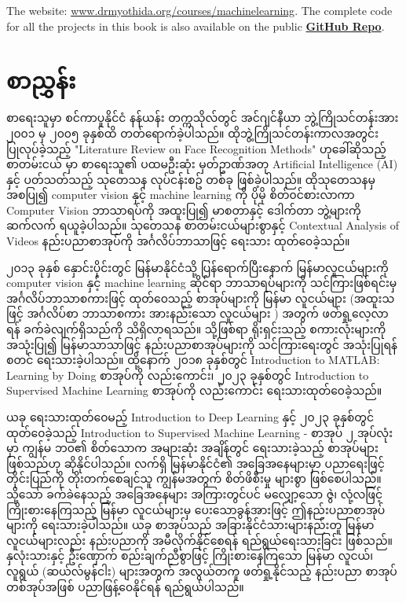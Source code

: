 The website: \href{www.drmyothida.org/courses}{www.drmyothida.org/courses/machinelearning}. The complete code for all the projects in this book is also available on the public \href{https://github.com/myothida/Intro-To-Supervised-Machine-Learning.git}{\textbf{GitHub Repo}}.

\chapter*{စာညွှန်း}

စာရေးသူမှာ စင်ကာပူနိုင်ငံ နန်ယန်း တက္ကသိုလ်တွင် အင်ဂျင်နီယာ ဘွဲ့ကြိုသင်တန်းအား ၂၀၀၁ မှ ၂၀၀၅ ခုနှစ်ထိ တတ်ရောက်ခဲ့ပါသည်။ ထိုဘွဲ့ကြိုသင်တန်းကာလအတွင်း ပြုလုပ်ခဲ့သည့် "Literature Review on Face Recognition Methods" ဟုခေါ်ဆိုသည့် စာတမ်းငယ် မှာ စာရေးသူ၏ ပထမဦးဆုံး မှတ်ဥာဏ်အတု Artificial Intelligence (AI) နှင့် ပတ်သတ်သည့် သုတေသန လုပ်ငန်းစဥ် တစ်ခု ဖြစ်ခဲ့ပါသည်။ ထိုသုတေသနမှ အစပြု၍ computer vision နှင့် machine learning ကို ပိုမို စိတ်၀င်စားလာကာ Computer Vision ဘာသာရပ်ကို အထူးပြု၍ မာစတာနှင့် ဒေါက်တာ ဘွဲ့များကို ဆက်လက် ရယူခဲ့ပါသည်။ သုတေသန စာတမ်းငယ်များစွာနှင့် Contextual Analysis of Videos နည်းပညာစာအုပ်ကို အင်္ဂလိပ်ဘာသာဖြင့်  ရေးသား ထုတ်၀ေခဲ့သည်။

၂၀၁၃ ခုနှစ် နှောင်းပိုင်းတွင် မြန်မာနိုင်ငံသို့ ပြန်ရောက်ပြီးနောက် မြန်မာလူငယ်များကို   computer vision နှင့် machine learning ဆိုင်ရာ ဘာသာရပ်များကို သင်ကြားဖြစ်ရင်းမှ အင်္ဂလိပ်ဘာသာစကားဖြင့် ထုတ်၀ေသည့် စာအုပ်များကို မြန်မာ လူငယ်များ (အထူးသဖြင့် အင်္ဂလိပ်စာ ဘာသာစကား အားနည်းသော လူငယ်များ ) အတွက် ဖတ်ရှု့လေ့လာရန် ခက်ခဲလျက်ရှိသည်ကို သိရှိလာရသည်။ သို့ဖြစ်ရာ ရိုးရှင်းသည့် စကားလုံးများကို အသုံးပြု၍ မြန်မာသာသာဖြင့် နည်းပညာစာအုပ်များကို သင်ကြားရေးတွင် အသုံးပြုရန် စတင် ရေးသားခဲ့ပါသည်။ ထို့နောက် ၂၀၁၈ ခုနှစ်တွင် Introduction to MATLAB: Learning by Doing စာအုပ်ကို လည်းကောင်း၊ ၂၀၂၃ ခုနှစ်တွင်  Introduction to Supervised Machine Learning စာအုပ်ကို လည်းကောင်း ရေးသားထုတ်၀ေခဲ့သည်။ 

ယခု ရေးသားထုတ်၀ေမည့် Introduction to Deep Learning နှင့်  ၂၀၂၃ ခုနှစ်တွင် ထုတ်၀ေခဲ့သည့် Introduction to Supervised Machine Learning - စာအုပ် ၂ အုပ်လုံးမှာ ကျွန်မ ဘ၀၏ စိတ်သောက အများဆုံး အချိန်တွင် ရေးသားခဲ့သည့် စာအုပ်များဖြစ်သည်ဟု ဆိုနိုင်ပါသည်။ လက်ရှိ မြန်မာနိုင်ငံ၏ အခြေအနေများမှာ ပညာရေးဖြင့် တိုင်းပြည်ကို တိုးတက်စေချင်သူ ကျွန်မအတွက် စိတ်ဖိစီးမှု များစွာ ဖြစ်စေပါသည်။ သို့သော် ခက်ခဲနေသည့် အခြေအနေများ အကြားတွင်ပင် မလျှော့သော ဇွဲ၊ လုံ့လဖြင့် ကြိုးစားနေကြသည့် မြန်မာ လူငယ်များမှ ပေးသောခွန်အားဖြင့် ဤနည်းပညာစာအုပ်များကို ရေးသားခဲ့ပါသည်။  ယခု စာအုပ်သည် အခြားနိုင်ငံသားများနည်းတူ မြန်မာ လူငယ်များလည်း နည်းပညာကို အမီလိုက်နိုင်စေရန် ရည်ရွယ်ရေးသားခြင်း ဖြစ်သည်။ နှလုံးသားနှင့် ဦးဏှောက် စည်းချက်ညီစွာဖြင့် ကြိုးစားနေကြသော မြန်မာ လူငယ်၊ လူရွယ် (ဆယ်လ်မွန်ငါး) များအတွက် အလွယ်တကူ ဖတ်ရှု့နိုင်သည့် နည်းပညာ စာအုပ်တစ်အုပ်အဖြစ် ပညာဖြန့်၀ေနိုင်ရန် ရည်ရွယ်ပါသည်။ 

